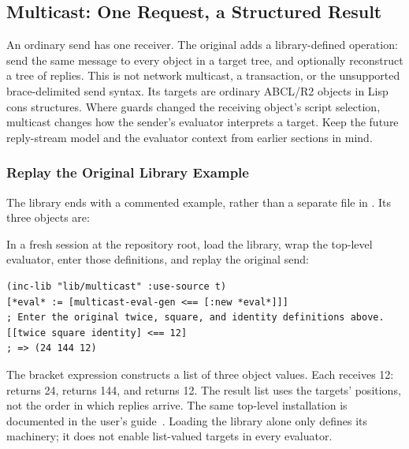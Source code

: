 \subsection{Multicast: One Request, a Structured Result}
\label{sec:multicast}

An ordinary send has one receiver. The original 
adds a library-defined operation: send the same message to every object in
a target tree, and optionally reconstruct a tree of replies. This is not
network multicast, a transaction, or the unsupported brace-delimited send
syntax. Its targets are ordinary ABCL/R2 objects in Lisp cons structures.
Where guards changed the receiving object's script selection, multicast
changes how the sender's evaluator interprets a target. Keep the future
reply-stream model and the evaluator context from earlier sections in mind.

\subsubsection{Replay the Original Library Example}

The library ends with a commented example, rather than a separate file in
. Its three objects are:


In a fresh session at the repository root, load the library, wrap the
top-level evaluator, enter those definitions, and replay the original send:

\begin{codeblock}
\begin{lstlisting}
(inc-lib "lib/multicast" :use-source t)
[*eval* := [multicast-eval-gen <== [:new *eval*]]]
; Enter the original twice, square, and identity definitions above.
[[twice square identity] <== 12]
; => (24 144 12)
\end{lstlisting}
\end{codeblock}

The bracket expression  constructs a list
of three object values. Each receives 12:  returns 24,
 returns 144, and  returns 12. The result list
uses the targets' positions, not the order in which replies arrive.
The same top-level installation is documented in the user's guide~\cite{guide}.
Loading the library alone only defines its machinery; it does not enable
list-valued targets in every evaluator.

